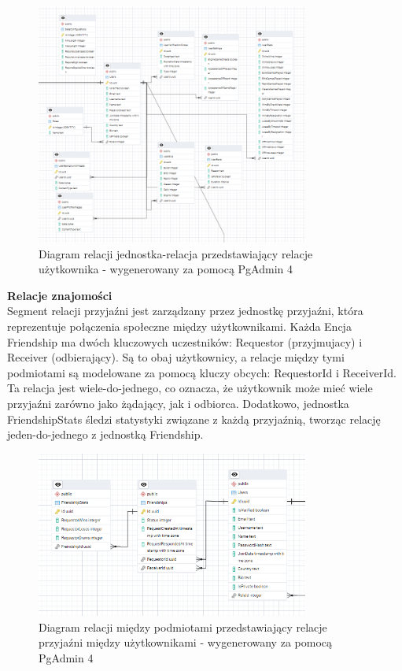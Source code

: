 \documentclass[12pt,a4paper]{article}
\begin{document}
\vspace{1cm}
\begin{figure}[h!]
    \centering
    \includegraphics[width=0.8\textwidth]{zdj/user_ERD.png}
    \caption{Diagram relacji jednostka-relacja przedstawiający relacje użytkownika - wygenerowany za pomocą PgAdmin 4}
\end{figure}
\newpage

\noindent \textbf{Relacje znajomości} \\
Segment relacji przyjaźni jest zarządzany przez jednostkę przyjaźni, która reprezentuje połączenia społeczne między użytkownikami. Każda Encja Friendship ma dwóch kluczowych uczestników: Requestor (przyjmujacy) i Receiver (odbierający). Są to obaj użytkownicy, a relacje między tymi podmiotami są modelowane za pomocą kluczy obcych: RequestorId i ReceiverId. Ta relacja jest wiele-do-jednego, co oznacza, że użytkownik może mieć wiele przyjaźni zarówno jako żądający, jak i odbiorca. Dodatkowo, jednostka FriendshipStats śledzi statystyki związane z każdą przyjaźnią, tworząc relację jeden-do-jednego z jednostką Friendship.

\vspace{1cm}
\begin{figure}[h!]
    \centering
    \includegraphics[width=0.8\textwidth]{zdj/friendship_ERD.png}
    \caption{Diagram relacji między podmiotami przedstawiający relacje przyjaźni między użytkownikami - wygenerowany za pomocą PgAdmin 4}
\end{figure}
\newpage
\end{document}
